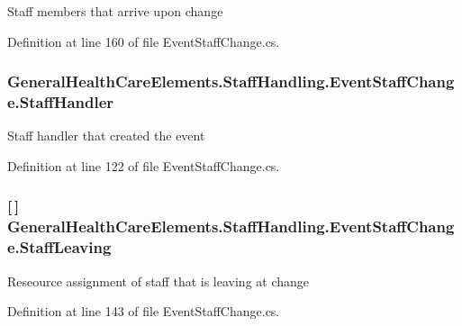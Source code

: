 Staff members that arrive upon change 



Definition at line 160 of file Event\+Staff\+Change.\+cs.

\subsubsection[{\texorpdfstring{Staff\+Handler}{StaffHandler}}]{ General\+Health\+Care\+Elements.\+Staff\+Handling.\+Event\+Staff\+Change.\+Staff\+Handler\hspace{0.3cm}{\ttfamily [get]}}\hypertarget{class_general_health_care_elements_1_1_staff_handling_1_1_event_staff_change_a3fe2bdafedd93ea53a525957aabf2698}{}\label{class_general_health_care_elements_1_1_staff_handling_1_1_event_staff_change_a3fe2bdafedd93ea53a525957aabf2698}


Staff handler that created the event 



Definition at line 122 of file Event\+Staff\+Change.\+cs.

\subsubsection[{\texorpdfstring{Staff\+Leaving}{StaffLeaving}}]{ \mbox{[}$\,$\mbox{]} General\+Health\+Care\+Elements.\+Staff\+Handling.\+Event\+Staff\+Change.\+Staff\+Leaving\hspace{0.3cm}{\ttfamily [get]}}\hypertarget{class_general_health_care_elements_1_1_staff_handling_1_1_event_staff_change_a1a05b49a27b84b2de048e99253d3ec3f}{}\label{class_general_health_care_elements_1_1_staff_handling_1_1_event_staff_change_a1a05b49a27b84b2de048e99253d3ec3f}


Reseource assignment of staff that is leaving at change 



Definition at line 143 of file Event\+Staff\+Change.\+cs.

